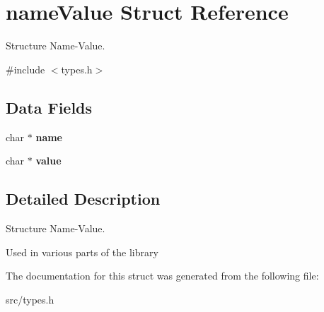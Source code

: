 \hypertarget{structnameValue}{
\section{nameValue Struct Reference}
\label{structnameValue}
}


Structure Name-\/Value.  




{\ttfamily \#include $<$types.h$>$}

\subsection*{Data Fields}
\begin{DoxyCompactItemize}
\item 
\hypertarget{structnameValue_ac3d2c6752f76d0cc0f73c9af3dda4ed6}{
char $\ast$ {\bfseries name}}
\label{structnameValue_ac3d2c6752f76d0cc0f73c9af3dda4ed6}

\item 
\hypertarget{structnameValue_a926a0523281bb4ec2ad7acd24b28f8d9}{
char $\ast$ {\bfseries value}}
\label{structnameValue_a926a0523281bb4ec2ad7acd24b28f8d9}

\end{DoxyCompactItemize}


\subsection{Detailed Description}
Structure Name-\/Value. \par
 Used in various parts of the library 

The documentation for this struct was generated from the following file:\begin{DoxyCompactItemize}
\item 
src/types.h\end{DoxyCompactItemize}
